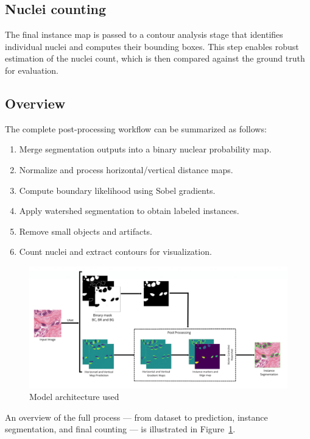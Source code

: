 \documentclass[target=bach,aauheader=,style=]{thud}
\begin{document}
\subsection{Nuclei counting}
The final instance map is passed to a contour analysis stage that identifies individual nuclei and computes their bounding boxes. 
This step enables robust estimation of the nuclei count, which is then compared against the ground truth for evaluation.

\subsection{Overview}
The complete post-processing workflow can be summarized as follows:
\begin{enumerate}
    \item Merge segmentation outputs into a binary nuclear probability map.
    \item Normalize and process horizontal/vertical distance maps.
    \item Compute boundary likelihood using Sobel gradients.
    \item Apply watershed segmentation to obtain labeled instances.
    \item Remove small objects and artifacts.
    \item Count nuclei and extract contours for visualization.
\end{enumerate}
\begin{figure}[H] %
    \centering
    \includegraphics[width=1\textwidth]{imgs/overall.jpg}
    \caption{Model architecture used}
    \label{fig:postproc_overview}
\end{figure}
An overview of the full process --- from dataset to prediction, instance segmentation, and final counting --- is illustrated in Figure~\ref{fig:postproc_overview}.
\end{document}
